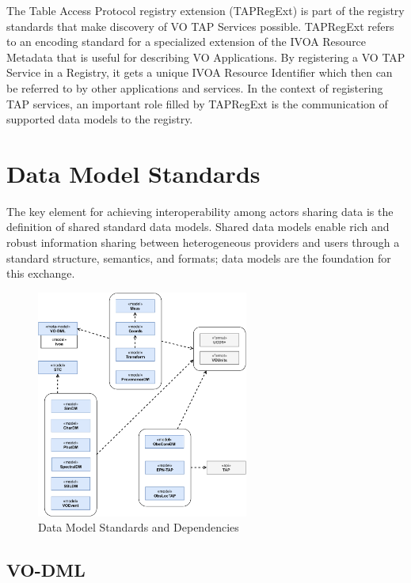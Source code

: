 \documentclass[11pt,a4paper]{ivoa}
\begin{document}
The Table Access Protocol registry extension (TAPRegExt) \citep{2012ivoa.spec.0827D} is part of the registry standards that make discovery of VO TAP Services possible.  
TAPRegExt refers to an encoding standard for a specialized extension of the IVOA Resource Metadata 
that is useful for describing VO Applications.  By registering a VO TAP Service in a Registry, it 
gets a unique IVOA Resource Identifier which then can be referred to by other applications and 
services.  In the context of registering TAP services, an important role filled by TAPRegExt is 
the communication of supported data models to the registry.

\section{Data Model Standards}

The key element for achieving interoperability among actors sharing data is the definition 
of shared standard data models. Shared data models enable rich and robust information sharing 
between heterogeneous providers and users through a standard structure, semantics, and formats; 
data models are the foundation for this exchange.

\begin{figure}
\centering
\includegraphics[width=0.62\textwidth]{ivoa-arch-dm.pdf}
\caption{Data Model Standards and Dependencies}
\label{fig:dmdeps}
\end{figure}

\subsection{VO-DML}
\end{document}
